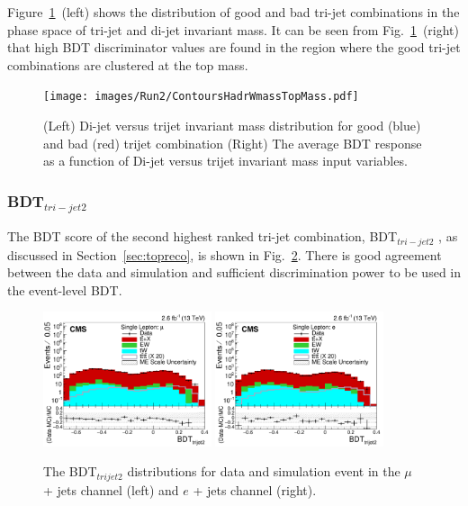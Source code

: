 Figure~\ref{fig:ContoursTopMassHadrWmass13}~(left) shows the distribution of good and bad tri-jet combinations in the phase space of tri-jet and di-jet invariant mass. It can be seen from Fig.~\ref{fig:ContoursTopMassHadrWmass13}~(right) that high BDT discriminator values are found in the region where the good tri-jet combinations are clustered at the top mass.
\begin{figure}[ht!]
\begin{center}
    \texttt{[image: images/Run2/ContoursHadrWmassTopMass.pdf]}
    \caption{(Left)  Di-jet versus trijet invariant mass distribution for good (blue) and bad (red) trijet combination (Right) The average BDT response as a function of Di-jet versus trijet invariant mass input variables.}
    \label{fig:ContoursTopMassHadrWmass13}
\end{center}
\end{figure}

\subsubsection*{BDT$_{tri-jet2}$}

The BDT score of the second highest ranked tri-jet combination, BDT$_{tri-jet2}$ , as discussed in Section~\ref{sec:topreco}, is shown in Fig.~\ref{fig:bdtTrijet213}. There is good agreement between the data and simulation and sufficient discrimination power to be used in the event-level BDT.

\begin{figure}[ht!]
    \includegraphics[width=0.44\textwidth]{images/Run2/BDT_trijet2_StackLogY.pdf}
    \includegraphics[width=0.44\textwidth]{images/Run2/BDT_trijet2_StackLogY_e.pdf}
    \caption{ The BDT$_{trijet2}$ distributions for data and simulation event in the $\mu$ + jets channel (left) and $e$ + jets channel (right).}
    \label{fig:bdtTrijet213}
\end{figure}

